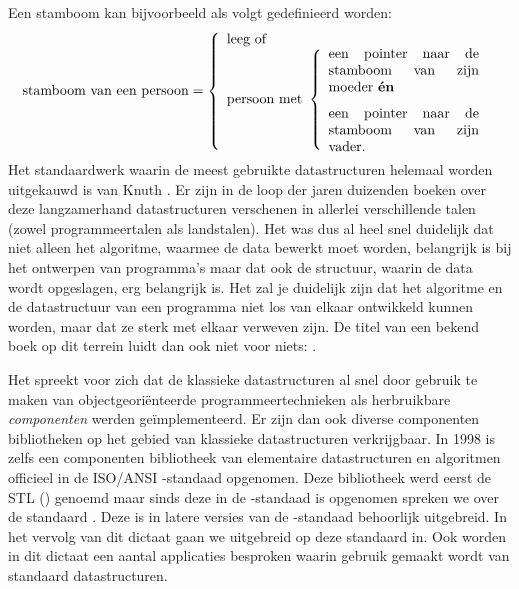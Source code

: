 \begin{cpplstShortInline}
Een stamboom kan bijvoorbeeld als volgt gedefinieerd worden:
\[
\text{stamboom van een persoon} = \left\{
\begin{array}{l}
\text{leeg of} \\
\text{persoon met} \ \left\{ 
\begin{array}{l}
\text{\parbox{25ex}{een pointer naar de stamboom van zijn moeder \textbf{én}}} \\ \\
\text{\parbox{25ex}{een pointer naar de stamboom van zijn vader.}}
\end{array}
\right.
\end{array}
\right.
\]
Het standaardwerk waarin de meest gebruikte datastructuren helemaal worden uitgekauwd is \emph{} van Knuth \cite{Knuth1997,Knuth1997a,Knuth1998}.
Er zijn in de loop der jaren duizenden boeken over deze langzamerhand  datastructuren verschenen in allerlei verschillende talen (zowel programmeertalen als landstalen).
Het was dus al heel snel duidelijk dat niet alleen het algoritme, waarmee de data bewerkt moet worden, belangrijk is bij het ontwerpen van programma's maar dat ook de structuur, waarin de data wordt opgeslagen, erg belangrijk is.
Het zal je duidelijk zijn dat het algoritme en de datastructuur van een programma niet los van elkaar ontwikkeld kunnen worden, maar dat ze sterk met elkaar verweven zijn.
De titel van een bekend boek op dit terrein luidt dan ook niet voor niets: \emph{} \cite{Wirth1978}.

Het spreekt voor zich dat de klassieke datastructuren al snel door gebruik te maken van objectgeoriënteerde programmeertechnieken als herbruikbare \emph{componenten} werden geïmplementeerd.
Er zijn dan ook diverse componenten bibliotheken op het gebied van klassieke datastructuren verkrijgbaar.
In 1998 is zelfs een componenten bibliotheek van elementaire datastructuren en algoritmen officieel in de ISO/ANSI \Cpp{}\hyp{}standaad opgenomen.
Deze bibliotheek werd eerst de STL () genoemd maar sinds deze  in de \Cpp{}\hyp{}standaad is opgenomen spreken we over de standaard \Cpp{} .
Deze  is in latere versies van de \Cpp{}\hyp{}standaad \cite{ISO2012,ISO2014,ISO2017} behoorlijk uitgebreid.
In het vervolg van dit dictaat gaan we uitgebreid op deze standaard \Cpp{}  in.
Ook worden in dit dictaat een aantal applicaties besproken waarin gebruik gemaakt wordt van standaard datastructuren.


\end{cpplstShortInline}
